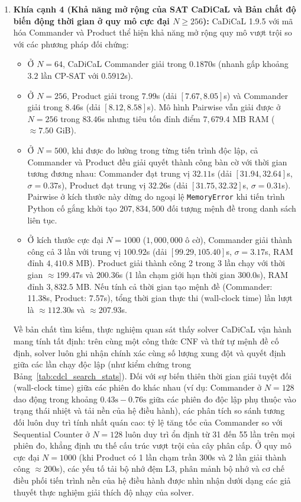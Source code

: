 \documentclass[a4paper,fleqn]{cas-sc}
\begin{document}
\begin{enumerate}
    \item \textbf{Khía cạnh 4 (Khả năng mở rộng của SAT CaDiCaL và Bản chất độ biến động thời gian ở quy mô cực đại $N \ge 256$):} 
    CaDiCaL 1.9.5 với mã hóa Commander và Product thể hiện khả năng mở rộng quy mô vượt trội so với các phương pháp đối chứng:
    \begin{itemize}
        \item Ở $N=64$, CaDiCaL Commander giải trong $0.1870$s (nhanh gấp khoảng $3.2$ lần CP-SAT với $0.5912$s).
        \item Ở $N=256$, Product giải trong $7.99$s (dải $[7.67, 8.05]$s) và Commander giải trong $8.46$s (dải $[8.12, 8.58]$s). Mô hình Pairwise vẫn giải được ở $N=256$ trong $83.46$s nhưng tiêu tốn đỉnh điểm $7{,}679.4$ MB RAM ($\approx 7.50$ GiB).
        \item Ở $N=500$, khi được đo lường trong từng tiến trình độc lập, cả Commander và Product đều giải quyết thành công bàn cờ với thời gian tương đương nhau: Commander đạt trung vị $32.11$s (dải $[31.94, 32.64]$s, $\sigma = 0.37$s), Product đạt trung vị $32.26$s (dải $[31.75, 32.32]$s, $\sigma = 0.31$s). Pairwise ở kích thước này dừng do ngoại lệ \texttt{MemoryError} khi tiến trình Python cố gắng khởi tạo $207{,}834{,}500$ đối tượng mệnh đề trong danh sách liên tục.
        \item Ở kích thước cực đại $N=1000$ ($1{,}000{,}000$ ô cờ), Commander giải thành công cả 3 lần với trung vị $100.92$s (dải $[99.29, 105.40]$s, $\sigma = 3.17$s, RAM đỉnh $4{,}410.8$ MB). Product giải thành công 2 trong 3 lần chạy với thời gian $\approx 199.47$s và $200.36$s (1 lần chạm giới hạn thời gian $300.0$s), RAM đỉnh $3{,}832.5$ MB. Nếu tính cả thời gian tạo mệnh đề (Commander: 11.38s, Product: 7.57s), tổng thời gian thực thi (wall-clock time) lần lượt là $\approx 112.30$s và $\approx 207.93$s.
    \end{itemize}
    Về bản chất tìm kiếm, thực nghiệm quan sát thấy solver CaDiCaL vận hành mang tính tất định: trên cùng một công thức CNF và thứ tự mệnh đề cố định, solver luôn ghi nhận chính xác cùng số lượng xung đột và quyết định giữa các lần chạy độc lập (như kiểm chứng trong Bảng~\ref{tab:cdcl_search_stats}). Đối với sự biến thiên thời gian giải tuyệt đối (wall-clock time) giữa các phiên đo khác nhau (ví dụ: Commander ở $N=128$ dao động trong khoảng $0.43\text{s} - 0.76\text{s}$ giữa các phiên đo độc lập phụ thuộc vào trạng thái nhiệt và tải nền của hệ điều hành), các phân tích so sánh tương đối luôn duy trì tính nhất quán cao: tỷ lệ tăng tốc của Commander so với Sequential Counter ở $N=128$ luôn duy trì ổn định từ 31 đến 55 lần trên mọi phiên đo, khẳng định ưu thế cấu trúc vượt trội của cây phân cấp. Ở quy mô cực đại $N=1000$ (khi Product có 1 lần chạm trần 300s và 2 lần giải thành công $\approx 200$s), các yếu tố tải bộ nhớ đệm L3, phân mảnh bộ nhớ và cơ chế điều phối tiến trình nền của hệ điều hành được nhìn nhận dưới dạng các giả thuyết thực nghiệm giải thích độ nhạy của solver.
\end{enumerate}
\end{document}

